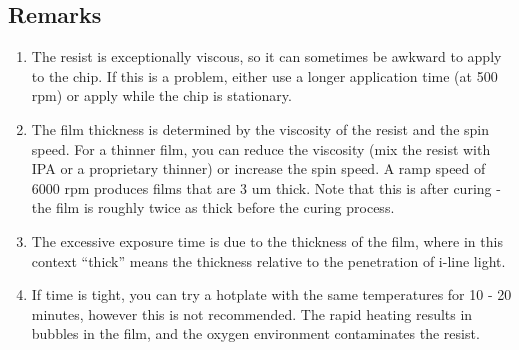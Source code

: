 \subsection{Remarks}
\begin{enumerate}
	\item The resist is exceptionally viscous, so it can sometimes be awkward to apply to the chip. If this is a problem, either use a longer application time (at 500 rpm) or apply while the chip is stationary.
	\item The film thickness is determined by the viscosity of the resist and the spin speed. For a thinner film, you can reduce the viscosity (mix the resist with IPA or a proprietary thinner) or increase the spin speed. A ramp speed of 6000 rpm produces films that are 3 um thick. Note that this is after curing - the film is roughly twice as thick before the curing process.
	\item The excessive exposure time is due to the thickness of the film, where in this context ``thick'' means the thickness relative to the penetration of i-line light.
	\item If time is tight, you can try a hotplate with the same temperatures for 10 - 20 minutes, however this is not recommended. The rapid heating results in bubbles in the film, and the oxygen environment contaminates the resist.
\end{enumerate}


\newpage
